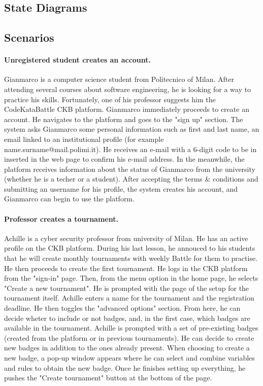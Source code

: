 \subsection{State Diagrams}
\label{subsec:state_diagrams}%


\subsection{Scenarios}
\label{subsec:scenarios}%

\paragraph{Unregistered student creates an account.}
Gianmarco is a computer science student from Politecnico of Milan. After attending several courses about software engineering, 
he is looking for a way to practice his skills. Fortunately, one of his professor suggests him the CodeKataBattle CKB platform.
Gianmarco immediately proceeds to create an account. He navigates to the platform and goes to the "sign up" section. 
The system asks Gianmarco some personal information such as first and last name, an email linked 
to an institutional profile (for example name.surname@mail.polimi.it). He receives an e-mail with a 
6-digit code to be in inserted in the web page to confirm his e-mail address. In the meanwhile, the platform 
receives information about the status of Gianmarco from the university (whether he is a techer or a student). 
After accepting the terms \& conditions 
and submitting an username for his profile, the system creates his account, and Gianmarco can begin to use the platform.

\paragraph{Professor creates a tournament. }
Achille is a cyber security professor from university of Milan. He has an active profile on the CKB platform. 
During his last lesson, he annouced to his students that he will create monthly tournaments with weekly Battle for them to practise. 
He then proceeds to create the first tournament. He logs in the CKB platform from the "sign-in" page. 
Then, from the menu option in the home page, he selects "Create a new tournament". He is prompted with the page of the setup for the tournament itself. 
Achille enters a name for the tournament and the registration deadline. He then toggles the "advanced options" section. 
From here, he can decide wheter to include or not badges, and, in the first case, which badges are available in the tournament. 
Achille is prompted with a set of pre-existing badges (created from the platform or in previous tournaments). He can decide to 
create new badges in addition to the ones already present. When choosing to create a new badge, a pop-up window appears where he can select and combine 
variables and rules to obtain the new badge. Once he finishes setting up everything, he pushes the "Create tournament" button at the bottom of the page. 

